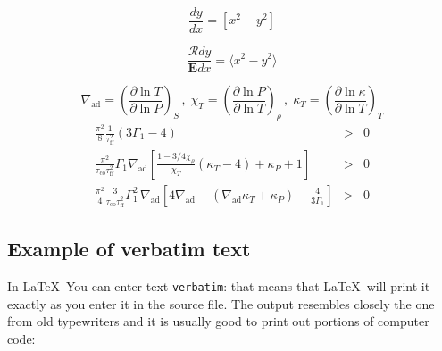 \documentclass[letterpaper,12pt]{article}
\begin{document}
\begin{equation}
 \displaystyle \frac{dy}{dx} = [ x^2 - y^2 ]
\end{equation}

\begin{equation}
 \displaystyle \frac{\mathcal R dy}{\mathbf E dx} = \langle x^2 - y^2 \rangle
\end{equation}

   \begin{displaymath}
      \nabla_{\mathrm{ad}} = \left( \frac{ \partial \ln T}
                             { \partial\ln P} \right)_{S} \, , \;
      \chi^{}_T       = \left( \frac{ \partial \ln P}
                             { \partial\ln T} \right)_{\rho} \, , \;
      \kappa^{}_{T}   = \left( \frac{ \partial \ln \kappa}
                             { \partial\ln T} \right)_{T}
   \end{displaymath} 
   \begin{eqnarray}
      \frac{\pi^2}{8} \frac{1}{\tau_{\mathrm{ff}}^2}
                ( 3 \Gamma_1 - 4 )
         & > & 0 \label{ZSDynSta} \\
      \frac{\pi^2}{\tau_{\mathrm{co}}
                   \tau_{\mathrm{ff}}^2}
                   \Gamma_1 \nabla_{\mathrm{ad}}
                   \left[ \frac{ 1- 3/4 \chi^{}_\rho }{ \chi^{}_T }
                          ( \kappa^{}_T - 4 )
                        + \kappa^{}_P + 1
                   \right]
        & > & 0 \label{ZSSecSta} \\
     \frac{\pi^2}{4} \frac{3}{\tau_{ \mathrm{co} }
                              \tau_{ \mathrm{ff} }^2
                             }
         \Gamma_1^2 \, \nabla_{\mathrm{ad}} \left[
                                   4 \nabla_{\mathrm{ad}}
                                   - ( \nabla_{\mathrm{ad}} \kappa^{}_T
                                     + \kappa^{}_P
                                     )
                                   - \frac{4}{3 \Gamma_1}
                                \right]
        & > & 0   \label{ZSVibSta}
   \end{eqnarray}

\subsection{Example of verbatim text}
In \LaTeX\, You can enter text \texttt{verbatim}: that means that 
\LaTeX\, will print it exactly as you enter it in the source file. The
output resembles closely the one from old typewriters and it
is usually good to print out portions of computer code:
\end{document}
